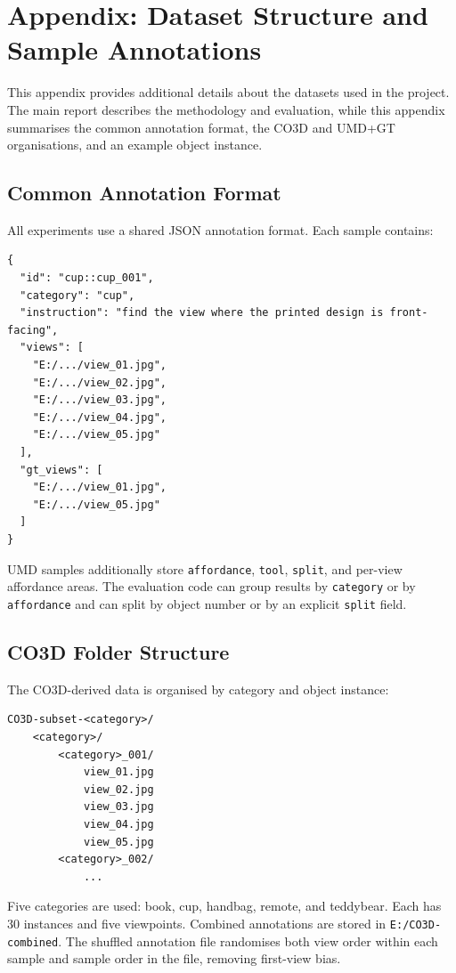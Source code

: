 \chapter{Appendix: Dataset Structure and Sample Annotations}
\label{app1}

This appendix provides additional details about the datasets used in the project. The main report describes the methodology and evaluation, while this appendix summarises the common annotation format, the CO3D and UMD+GT organisations, and an example object instance.

\section{Common Annotation Format}

All experiments use a shared JSON annotation format. Each sample contains:

\begin{verbatim}
{
  "id": "cup::cup_001",
  "category": "cup",
  "instruction": "find the view where the printed design is front-facing",
  "views": [
    "E:/.../view_01.jpg",
    "E:/.../view_02.jpg",
    "E:/.../view_03.jpg",
    "E:/.../view_04.jpg",
    "E:/.../view_05.jpg"
  ],
  "gt_views": [
    "E:/.../view_01.jpg",
    "E:/.../view_05.jpg"
  ]
}
\end{verbatim}

UMD samples additionally store \texttt{affordance}, \texttt{tool}, \texttt{split}, and per-view affordance areas. The evaluation code can group results by \texttt{category} or by \texttt{affordance} and can split by object number or by an explicit \texttt{split} field.

\section{CO3D Folder Structure}

The CO3D-derived data is organised by category and object instance:

\begin{verbatim}
CO3D-subset-<category>/
    <category>/
        <category>_001/
            view_01.jpg
            view_02.jpg
            view_03.jpg
            view_04.jpg
            view_05.jpg
        <category>_002/
            ...
\end{verbatim}

Five categories are used: book, cup, handbag, remote, and teddybear. Each has 30 instances and five viewpoints. Combined annotations are stored in \texttt{E:/CO3D-combined}. The shuffled annotation file randomises both view order within each sample and sample order in the file, removing first-view bias.

